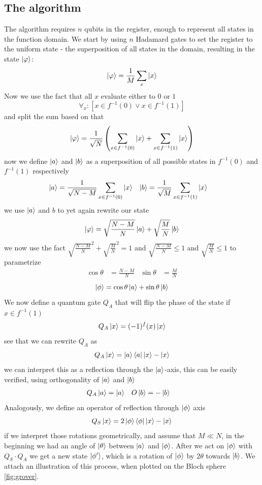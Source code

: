 \subsection{The algorithm}
The algorithm requires $n$ qubits in the register, enough to represent all states in the function domain. We start by using $n$ Hadamard gates to set the register to the uniform state - the superposition of all states in the domain, resulting in the state $\ket{\varphi}$:
$$\ket{\varphi}=\frac{1}{M}\sum_x \ket{x}$$
Now we use the fact that all $x$ evaluate either to $0$ or $1$
$$\forall_x: \left[x\in f^{-1}(0) \lor x\in f^{-1}(1)\right]$$
and split the sum based on that
$$\ket{\varphi}=\frac{1}{\sqrt{N}}\left(\sum_{x\in f^{-1}(0)}\ket{x}+\sum_{x\in f^{-1}(1)}\ket{x}\right)$$ 
now we define $\ket{a}$ and $\ket{b}$ as a superposition of all possible states in $f^{-1}(0)$ and $f^{-1}(1)$ respectively 
\begin{align*}
    \ket{a}&=\frac{1}{\sqrt{N-M}}\sum_{x \in f^{-1}(0)} \ket{x}&
    \ket{b}&=\frac{1}{\sqrt{M}}\sum_{x \in f^{-1}(1)} \ket{x}
\end{align*}
we use $\ket{a}$ and $b$ to yet again rewrite our state
$$\ket{\varphi}=\sqrt{\frac{N-M}{N}}\ket{a}+\sqrt{\frac{M}{N}}\ket{b}$$
we now use the fact $\sqrt{\frac{N-M}{N}}^2+\sqrt{\frac{M}{N}}^2=1$ and $\sqrt{\frac{N-M}{N}}\leq 1$ and $\sqrt{\frac{M}{N}} \leq 1$ to parametrize
\begin{align*}
  \cos{\theta} &= \frac{N-M}{N} & \sin{\theta} &= \frac{M}{N}
\end{align*}
$$\ket{\phi}=\cos{\theta} \ket{a} + \sin{\theta} \ket{b}$$
We now define a quantum gate $Q_A$ that will flip the phase of the state if $x\in f^{-1}(1)$ 
$$Q_A\ket{x}=(-1)^f(x)\ket{x}$$ 
see that we can rewrite $Q_A$ as 
$$Q_A\ket{x}=\ket{a}\bra{a}\ket{x}-\ket{x}$$
we can interpret this as a reflection through the $\ket{a}$-axis, this can be easily verified, using orthogonality of $\ket{a}$ and $\ket{b}$ 
\begin{align*}
  Q_A\ket{a}&=\ket{a} & O\ket{b}&=-\ket{b}
\end{align*}
Analogously, we define an operator of reflection through $\ket{\phi}$ axis 
$$Q_S\ket{x}=2\ket{\phi}\bra{\phi}\ket{x}-\ket{x}$$
if we interpret those rotations geometrically, and assume that $M \ll N$, in the beginning we had an angle of $\ket{\theta}$ between $\ket{a}$ and $\ket{\phi}$. After we act on $\ket{\phi}$ with $Q_S\cdot Q_A$ we get a new state $\ket{\phi'}$, which is a rotation of $\ket{\phi}$ by $2\theta$ towards $\ket{b}$. We attach an illustration of this process, when plotted on the Bloch sphere \ref{fig:grover}.

